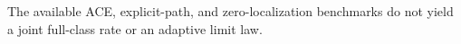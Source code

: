 The available ACE, explicit-path, and zero-localization benchmarks do not yield a joint full-class rate or an adaptive limit law.